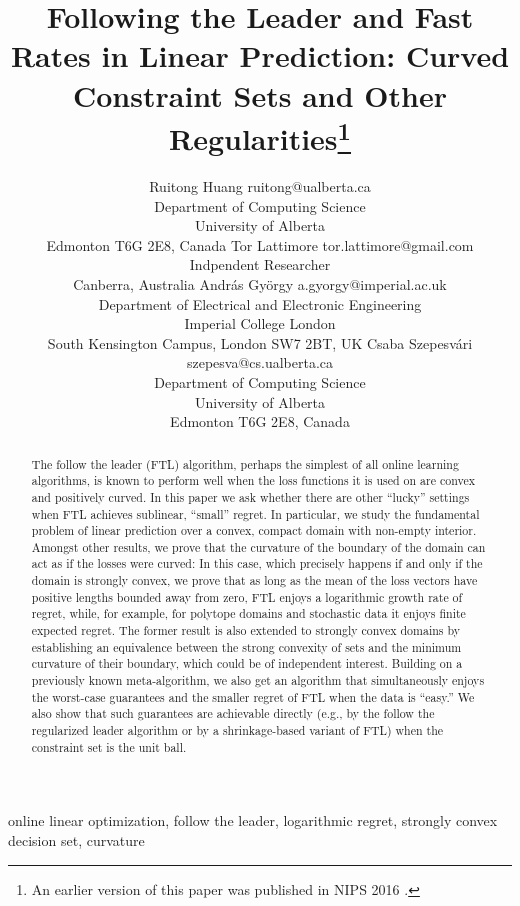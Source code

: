 \documentclass[english]{article}
\title{
Following the Leader and
Fast Rates in Linear Prediction:
Curved Constraint Sets and Other Regularities\thanks{An earlier version of this paper was published in NIPS 2016 \citep{HuLaGySz16}.}%
}
\author{\name Ruitong Huang \email ruitong@ualberta.ca \\
  \addr Department of Computing Science\\
  University of Alberta\\
  Edmonton T6G 2E8, Canada 
 \AND
 \name Tor Lattimore \email tor.lattimore@gmail.com \\
 \addr Indpendent Researcher \\
 Canberra, Australia
  \AND
  \name Andr\'as Gy\"orgy \email  a.gyorgy@imperial.ac.uk\\
  \addr Department of Electrical and Electronic Engineering\\
  Imperial College London\\
  South Kensington Campus, London SW7 2BT, UK 
  \AND
  \name Csaba Szepesv\'ari \email szepesva@cs.ualberta.ca \\
  \addr Department of Computing Science\\
  University of Alberta\\
  Edmonton T6G 2E8, Canada
}
\begin{document}
\maketitle

\begin{abstract}
The follow the leader (FTL) algorithm, perhaps the simplest of all online learning algorithms,
is known to perform well when the loss functions it is used on are convex and positively curved.
In this paper we ask whether there are other ``lucky'' settings when FTL achieves sublinear, ``small'' regret.
In particular, we study the fundamental problem of linear prediction over a  convex, compact domain with non-empty interior.
Amongst other results, we prove that the curvature of  the boundary of the domain can act as if the losses
were curved: In this case, which precisely happens if and only if the domain is strongly convex, we prove that as long as 
the mean of the loss vectors have positive lengths bounded away from zero, 
FTL enjoys a logarithmic growth rate of regret, while, for example, for polytope domains and stochastic data it enjoys
finite expected regret.
The former result is also extended to strongly convex domains by establishing an equivalence between the strong convexity of sets and the minimum curvature of their boundary,
which could be of independent interest.
Building on a previously known meta-algorithm, we also get
 an algorithm that simultaneously enjoys the worst-case guarantees and the smaller regret of FTL when the data is ``easy.''
 We also show that such guarantees are achievable directly (e.g., by the follow the regularized leader algorithm or by a shrinkage-based variant of FTL)
 when the constraint set is the unit ball.
\end{abstract}

\begin{keywords}
online linear optimization, follow the leader, logarithmic regret, strongly convex decision set, curvature
\end{keywords} 
\end{document}
